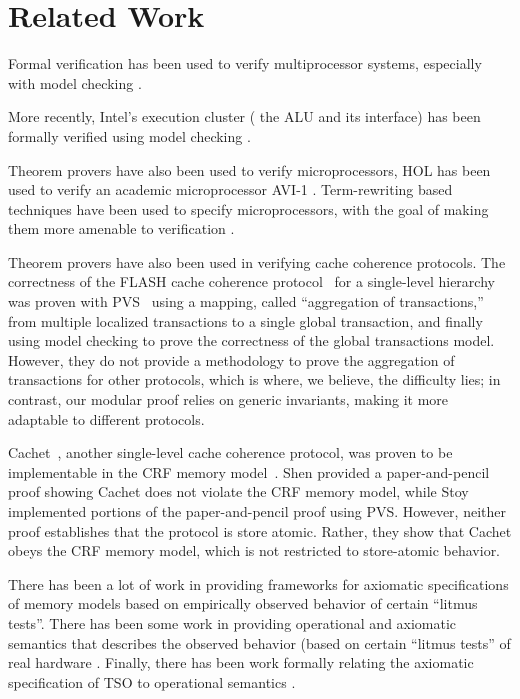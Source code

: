\section{Related Work}
\label{relatedWork}

Formal verification has been used to verify multiprocessor
systems, especially with model checking
\cite{burch1994automatic,mcmillan1998verification}.

More recently, Intel's execution cluster (\ie{} the ALU and its
interface) has been formally verified using model checking
\cite{kaivola2009replacing}.

Theorem provers have also been used to verify microprocessors, \eg{} HOL has been
used to verify an academic microprocessor AVI-1 \cite{windley1995formal}.
Term-rewriting based techniques have been used to specify microprocessors, with
the goal of making them more amenable to verification \cite{shen1999using}.

Theorem provers have also been used in verifying cache coherence protocols.
The correctness of the FLASH cache coherence protocol~\cite{flash} for a
single-level hierarchy was proven with PVS~\cite{park} using a mapping, called
``aggregation of transactions,'' from multiple localized transactions to a
single global transaction, and finally using model checking to prove the correctness of
the global transactions model. However, they do not provide a methodology to
prove the aggregation of transactions for other protocols, which is where, we
believe, the difficulty lies; in contrast, our modular proof relies on generic
invariants, making it more adaptable to different protocols.

Cachet~\cite{StoyShenArvind:Proofs}, another single-level cache coherence
protocol, was proven to be implementable in the CRF memory
model~\cite{Shen:CRF}. Shen \etal{} provided a paper-and-pencil proof showing
Cachet does not violate the CRF memory model, while Stoy \etal{} implemented
portions of the paper-and-pencil proof using PVS. However, neither proof
establishes that the protocol is store atomic. Rather, they show that Cachet
obeys the CRF memory model, which is not restricted to store-atomic behavior.

There has been a lot of work in providing frameworks for axiomatic
specifications of memory models based on empirically observed behavior of
certain ``litmus
tests''\cite{Alglave11,Alglave:FMSD,alglave2012formal,Alglave:2010,Alglave:TACAS,alglave2014herding}.
There has been some work in providing operational and axiomatic semantics that
describes the observed behavior (based on certain ``litmus tests'' of real
hardware
\cite{mador2012axiomatic,sarkar2011understanding,sarkar2012synchronising}.
Finally, there has been work formally relating the axiomatic specification of
TSO to operational semantics \cite{x86tsocacm10}.

